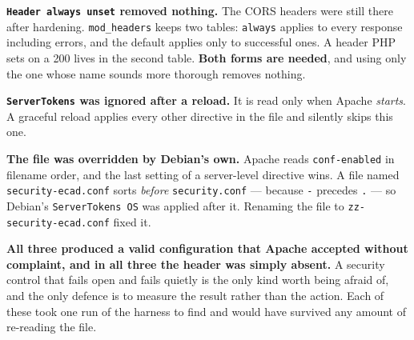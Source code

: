 \begin{examplebox}
\begin{tightnum}
  \item \textbf{\texttt{Header always unset} removed nothing.} The CORS headers
        were still there after hardening. \texttt{mod\_headers} keeps two
        tables: \texttt{always} applies to every response including errors, and
        the default applies only to successful ones. A header PHP sets on a 200
        lives in the second table. \textbf{Both forms are needed}, and using
        only the one whose name sounds more thorough removes nothing.
  \item \textbf{\texttt{ServerTokens} was ignored after a reload.} It is read
        only when Apache \emph{starts}. A graceful reload applies every other
        directive in the file and silently skips this one.
  \item \textbf{The file was overridden by Debian's own.} Apache reads
        \texttt{conf-enabled} in filename order, and the last setting of a
        server-level directive wins. A file named
        \texttt{security-ecad.conf} sorts \emph{before}
        \texttt{security.conf} --- because \texttt{-} precedes \texttt{.} ---
        so Debian's \texttt{ServerTokens OS} was applied after it. Renaming
        the file to \texttt{zz-security-ecad.conf} fixed it.
\end{tightnum}

\smallskip
\textbf{All three produced a valid configuration that Apache accepted without
complaint, and in all three the header was simply absent.} A security control
that fails open and fails quietly is the only kind worth being afraid of, and
the only defence is to measure the result rather than the action. Each of these
took one run of the harness to find and would have survived any amount of
re-reading the file.
\end{examplebox}

